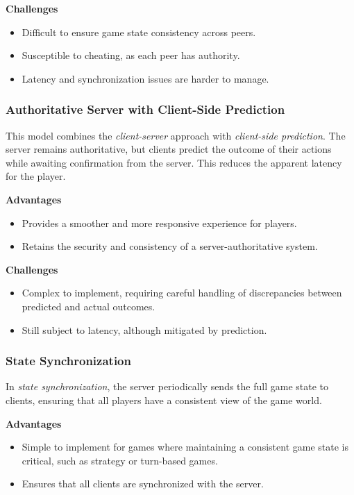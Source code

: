 \documentclass{article} %
\begin{document}
\textbf{Challenges}
\begin{itemize}
    \item Difficult to ensure game state consistency across peers.
    \item Susceptible to cheating, as each peer has authority.
    \item Latency and synchronization issues are harder to manage.
\end{itemize}

\subsubsection{Authoritative Server with Client-Side Prediction}
This model combines the \textit{client-server} approach with \textit{client-side prediction}. The server remains authoritative, but clients predict the outcome of their actions while awaiting confirmation from the server. This reduces the apparent latency for the player.

\textbf{Advantages}
\begin{itemize}
    \item Provides a smoother and more responsive experience for players.
    \item Retains the security and consistency of a server-authoritative system.
\end{itemize}

\textbf{Challenges}
\begin{itemize}
    \item Complex to implement, requiring careful handling of discrepancies between predicted and actual outcomes.
    \item Still subject to latency, although mitigated by prediction.
\end{itemize}

\subsubsection{State Synchronization}
In \textit{state synchronization}, the server periodically sends the full game state to clients, ensuring that all players have a consistent view of the game world.

\textbf{Advantages}
\begin{itemize}
    \item Simple to implement for games where maintaining a consistent game state is critical, such as strategy or turn-based games.
    \item Ensures that all clients are synchronized with the server.
\end{itemize}
\end{document}
